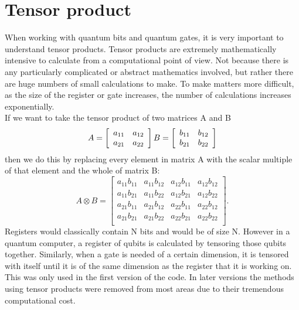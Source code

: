 \documentclass[12pt]{report}
\begin{document}
\section{Tensor product}
When working with quantum bits and quantum gates, it is very important to understand tensor products. Tensor products are extremely mathematically intensive to calculate from a computational point of view. Not because there is any particularly complicated or abstract mathematics involved, but rather there are huge numbers of small calculations to make. To make matters more difficult, as the size of the register or gate increases, the number of calculations increases exponentially. \\
If we want to take the tensor product of two matrices A and B
\begin{equation}
A =  
\left[
{
\begin{array} {cc}
a_{11} & a_{12} \\
a_{21} & a_{22} \\
\end{array}
}
\right]
\\
B =  
\left[
{
\begin{array} {cc}
b_{11} & b_{12} \\
b_{21} & b_{22} \\
\end{array}
}
\right]
\end{equation}
then we do this by replacing every element in matrix A with the scalar multiple of that element and the whole of matrix B:
\begin{equation}
A \otimes B =  
\left[
{
\begin{array} {cccc}
a_{11}b_{11} & a_{11}b_{12} & a_{12}b_{11} & a_{12}b_{12} \\
a_{11}b_{21} & a_{11}b_{22} & a_{12}b_{21} & a_{12}b_{22}\\
a_{21}b_{11} & a_{21}b_{12} & a_{22}b_{11} & a_{22}b_{12} \\
a_{21}b_{21} & a_{21}b_{22} & a_{22}b_{21} & a_{22}b_{22} \\
\end{array}
}
\right].
\end{equation}
Registers would classically contain N bits and would be of size N. However in a quantum computer, a register of qubits is calculated by tensoring those qubits together. Similarly, when a gate is needed of a certain dimension, it is tensored with itself until it is of the same dimension as the register that it is working on.
This was only used in the first version of the code. In later versions the methods using tensor products were removed from most areas due to their tremendous computational cost.
\end{document}
